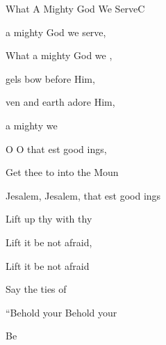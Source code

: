 \documentclass[a5paper,11pt]{book}
\begin{document}
\begin{song}{What A Mighty God We Serve}{C}
\begin{SBExtraKeys}
{    \begin{SBOpGroup}
       a mighty God we serve,
        
      What a mighty God we ,
      
      gels bow before Him,
      
      ven and earth adore Him,
      
       a mighty  we \Ch{[}{} \Ch{]}{}
    \end{SBOpGroup}

    \begin{SBVerse}
      O  O  that est good ings,
                
      Get thee  to into the  Moun

      Jesalem, Jesalem, that est good ings

      Lift up thy  with  thy 

      Lift it  be not afraid,

      Lift it  be not afraid

      Say  the ties of 

      ``Behold your  Behold your 

      Be  
    \end{SBVerse}
  }\end{SBExtraKeys}
\end{song}
\end{document}
